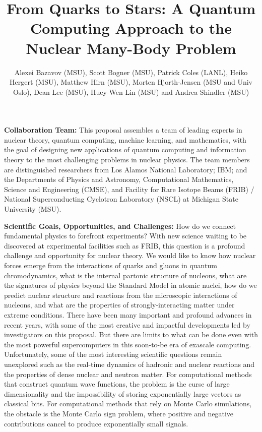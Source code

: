 \documentclass[aps,twocolumn,showpacs,floatfix,nofootinbib,preprintnumbers,superscriptaddress,amsmath,amssymb]{revtex4-1}
\begin{document}
\title{From Quarks to Stars: A Quantum Computing Approach to the Nuclear Many-Body Problem}


\author{Alexei Bazavov (MSU), Scott Bogner (MSU), Patrick Coles (LANL), Heiko Hergert (MSU), Matthew Hirn (MSU), Morten Hjorth-Jensen (MSU and Univ Oslo), Dean Lee (MSU), Huey-Wen Lin (MSU) and Andrea Shindler (MSU)}

\maketitle
{\bf Collaboration Team:} This proposal assembles a team of leading experts 
in nuclear theory, quantum computing, machine learning, and mathematics, with 
the goal of designing new applications of quantum computing and information theory 
to the most challenging problems in nuclear physics. The team members are 
distinguished researchers from Los Alamos National Laboratory; IBM; and the 
Departments of Physics and Astronomy, Computational Mathematics, Science and 
Engineering (CMSE), and Facility for Rare Isotope Beams (FRIB) / National Superconducting Cyclotron Laboratory (NSCL) at 
Michigan State University (MSU).

{\bf Scientific Goals, Opportunities, and Challenges:} 
How do we connect fundamental physics to forefront experiments?  With new science 
waiting to be discovered at experimental facilities such as FRIB, this question is a 
profound challenge and opportunity for nuclear theory.  We would like to know how nuclear forces emerge from the interactions of quarks and gluons in quantum chromodynamics, what is the internal partonic structure of nucleons, what are the signatures of physics beyond the Standard Model in atomic nuclei, how do we predict nuclear structure and reactions from the microscopic interactions of nucleons, and what are the properties of strongly-interacting matter under extreme conditions.  There have been many important and profound advances in recent years, with some of the most creative and impactful developments led by investigators on this proposal.  But there are limits to what can be done even with the most powerful supercomputers in this soon-to-be era of exascale computing.  Unfortunately, some of the most interesting scientific questions remain unexplored such as the real-time dynamics of hadronic and nuclear reactions and the properties of dense nuclear and neutron matter. For computational methods that construct quantum wave functions, the problem is the curse of large dimensionality and the impossibility of storing exponentially large vectors as classical bits.  For computational methods that rely on Monte Carlo simulations, the obstacle is the Monte Carlo sign problem, where positive and negative contributions cancel to produce exponentially small signals.
\end{document}
